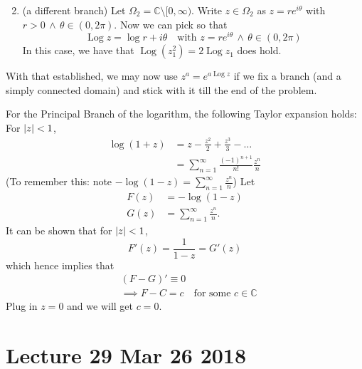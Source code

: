 \documentclass[11pt, oneside]{book}
\DeclareMathOperator{\Log}{Log}
\begin{document}
\begin{enumerate}
  \setcounter{enumi}{1}
  \item (a different branch) Let $\Omega_2 = \mathbb{C} \setminus [0, \infty)$. Write $z \in \Omega_2$ as $z = re^{i \theta}$ with $r > 0 \, \land \, \theta \in (0, 2 \pi)$. Now we can pick  so that
  \begin{equation*}
    \Log z = \log r + i \theta \quad \text{with } z = re^{i \theta} \, \land \, \theta \in (0, 2\pi)
  \end{equation*}
  In this case, we have that $\Log (z_1^2) = 2 \Log z_1$ does hold.
\end{enumerate}

With that established, we may now use $z^a = e^{a \Log z}$ if we fix a branch (and a simply connected domain) and stick with it till the end of the problem.

\begin{remark}
  For the Principal Branch of the logarithm, the following Taylor expansion holds: \\
  For $\left|z\right| < 1$,
  \begin{align*}
    \log (1 + z) &= z - \frac{z^2}{2} + \frac{z^3}{3} - \hdots \\
      &= \sum_{n=1}^{\infty} \frac{(-1)^{n + 1}}{n!} \frac{z^n}{n}
  \end{align*}
  (To remember this: note $- \log (1 - z) = \sum_{n=1}^{\infty} \frac{z^n}{n}$)
  Let
  \begin{align*}
    F(z) &= - \log (1 - z) \\
    G(z) &= \sum_{n=1}^{\infty} \frac{z^n}{n}.
  \end{align*}
  It can be shown that for $\left|z\right| < 1$,
  \begin{equation*}
    F'(z) = \frac{1}{1 - z} = G'(z)
  \end{equation*}
  which hence implies that
  \begin{align*}
    &(F - G)' \equiv 0 \\
    &\implies F - C = c \quad \text{for some } c \in \mathbb{C}
  \end{align*}
  Plug in $z = 0$ and we will get $c = 0$.
\end{remark}



\chapter{Lecture 29 Mar 26 2018}
  \label{chapter:lecture_29_mar_26_2018}
\end{document}
